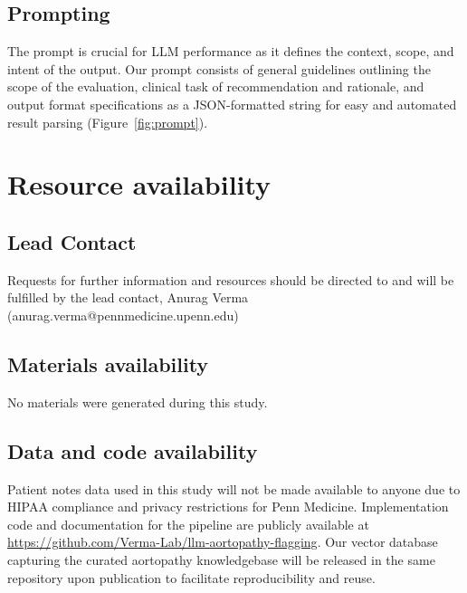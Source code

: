 \documentclass[fleqn,10pt]{wlscirep}
\begin{document}
\subsection*{Prompting}


The prompt is crucial for LLM performance as it defines the context, scope, and intent of the output. Our prompt consists of general guidelines outlining the scope of the evaluation, clinical task of recommendation and rationale, and output format specifications as a JSON-formatted string for easy and automated result parsing (Figure~\ref{fig:prompt}). 



\section*{Resource availability}

\subsection*{Lead Contact}
Requests for further information and resources should be directed to and will be fulfilled by the lead contact, Anurag Verma (anurag.verma@pennmedicine.upenn.edu)

\subsection*{Materials availability}
No materials were generated during this study. 

\subsection*{Data and code availability}
Patient notes data used in this study will not be made available to anyone due to HIPAA compliance and privacy restrictions for Penn Medicine. Implementation code and documentation for the pipeline are publicly available at \url{https://github.com/Verma-Lab/llm-aortopathy-flagging}. Our vector database capturing the curated aortopathy knowledgebase will be released in the same repository upon publication to facilitate reproducibility and reuse.


\end{document}
